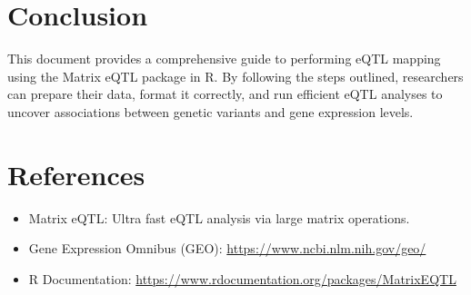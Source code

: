 \documentclass[12pt,a4paper]{article}
\begin{document}
\section{Conclusion}
This document provides a comprehensive guide to performing eQTL mapping using the Matrix eQTL package in R. By following the steps outlined, researchers can prepare their data, format it correctly, and run efficient eQTL analyses to uncover associations between genetic variants and gene expression levels.

\section{References}
\begin{itemize}
    \item Matrix eQTL: Ultra fast eQTL analysis via large matrix operations. 
    \item Gene Expression Omnibus (GEO): \url{https://www.ncbi.nlm.nih.gov/geo/}
    \item R Documentation: \url{https://www.rdocumentation.org/packages/MatrixEQTL}
\end{itemize}
\end{document}
